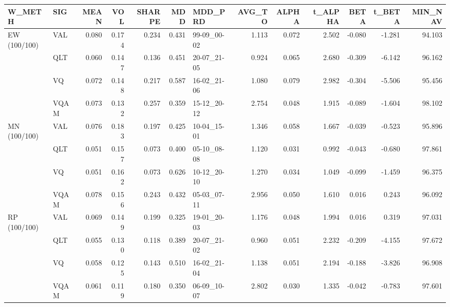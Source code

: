 \begin{tabular}{llrrrrlrrrrrr}
\toprule
W\_METH & SIG & MEAN & VOL & SHARPE & MDD & MDD\_PRD & AVG\_TO & ALPHA & t\_ALPHA & BETA & t\_BETA & MIN\_NAV \\
\midrule
EW (100/100) & VAL & 0.080 & 0.174 & 0.234 & 0.431 & 99-09\_00-02 & 1.113 & 0.072 & 2.502 & -0.080 & -1.281 & 94.103 \\
 & QLT & 0.060 & 0.147 & 0.136 & 0.451 & 20-07\_21-05 & 0.924 & 0.065 & 2.680 & -0.309 & -6.142 & 96.162 \\
 & VQ & 0.072 & 0.148 & 0.217 & 0.587 & 16-02\_21-06 & 1.080 & 0.079 & 2.982 & -0.304 & -5.506 & 95.456 \\
 & VQAM & 0.073 & 0.132 & 0.257 & 0.359 & 15-12\_20-12 & 2.754 & 0.048 & 1.915 & -0.089 & -1.604 & 98.102 \\
MN (100/100) & VAL & 0.076 & 0.183 & 0.197 & 0.425 & 10-04\_15-01 & 1.346 & 0.058 & 1.667 & -0.039 & -0.523 & 95.896 \\
 & QLT & 0.051 & 0.157 & 0.073 & 0.400 & 05-10\_08-08 & 1.120 & 0.031 & 0.992 & -0.043 & -0.680 & 97.861 \\
 & VQ & 0.051 & 0.162 & 0.073 & 0.626 & 10-12\_20-10 & 1.270 & 0.034 & 1.049 & -0.099 & -1.459 & 96.375 \\
 & VQAM & 0.078 & 0.156 & 0.243 & 0.432 & 05-03\_07-11 & 2.956 & 0.050 & 1.610 & 0.016 & 0.243 & 96.092 \\
RP (100/100) & VAL & 0.069 & 0.149 & 0.199 & 0.325 & 19-01\_20-03 & 1.176 & 0.048 & 1.994 & 0.016 & 0.319 & 97.031 \\
 & QLT & 0.055 & 0.130 & 0.118 & 0.389 & 20-07\_21-02 & 0.960 & 0.051 & 2.232 & -0.209 & -4.155 & 97.672 \\
 & VQ & 0.058 & 0.125 & 0.143 & 0.510 & 16-02\_21-04 & 1.138 & 0.051 & 2.194 & -0.188 & -3.826 & 96.908 \\
 & VQAM & 0.061 & 0.119 & 0.180 & 0.350 & 06-09\_10-07 & 2.802 & 0.030 & 1.335 & -0.042 & -0.783 & 97.601 \\
\bottomrule
\end{tabular}
